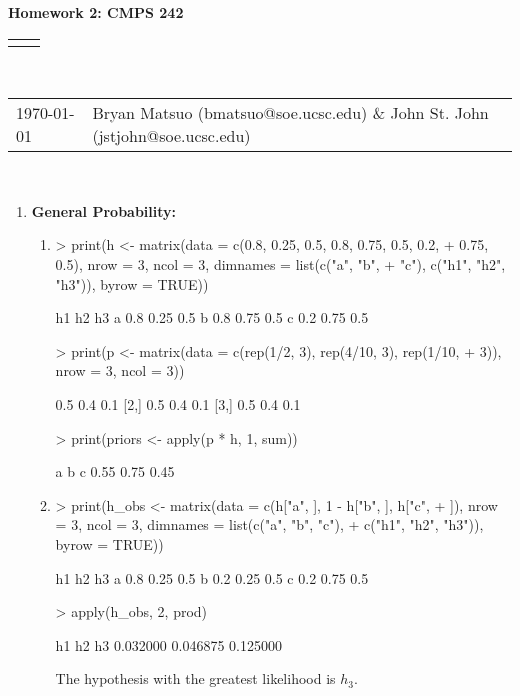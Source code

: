 \documentclass[12pt]{article}
\renewcommand{\title}[1]{\textbf{#1}\\}
\renewcommand{\line}{\begin{tabularx}{\textwidth}{X>{\raggedleft}X}\hline\\\end{tabularx}\\[-0.5cm]}
\newcommand{\leftright}[2]{\begin{tabularx}{\textwidth}{X>{\raggedleft}X}#1%
& #2\\\end{tabularx}\\[-0.5cm]}
\begin{document}
\title{Homework 2: CMPS 242}
\line
\leftright{\today}{Bryan Matsuo (bmatsuo@soe.ucsc.edu) \& John St. John (jstjohn@soe.ucsc.edu)} %
\begin{enumerate}
\item \textbf{General Probability: }

\begin{enumerate}
\item %
\begin{Schunk}
\begin{Sinput}
> print(h <- matrix(data = c(0.8, 0.25, 0.5, 0.8, 0.75, 0.5, 0.2, 
+     0.75, 0.5), nrow = 3, ncol = 3, dimnames = list(c("a", "b", 
+     "c"), c("h1", "h2", "h3")), byrow = TRUE))
\end{Sinput}
\begin{Soutput}
   h1   h2  h3
a 0.8 0.25 0.5
b 0.8 0.75 0.5
c 0.2 0.75 0.5
\end{Soutput}
\begin{Sinput}
> print(p <- matrix(data = c(rep(1/2, 3), rep(4/10, 3), rep(1/10, 
+     3)), nrow = 3, ncol = 3))
\end{Sinput}
\begin{Soutput}
     [,1] [,2] [,3]
[1,]  0.5  0.4  0.1
[2,]  0.5  0.4  0.1
[3,]  0.5  0.4  0.1
\end{Soutput}
\begin{Sinput}
> print(priors <- apply(p * h, 1, sum))
\end{Sinput}
\begin{Soutput}
   a    b    c 
0.55 0.75 0.45 
\end{Soutput}
\end{Schunk}
\item %
\begin{Schunk}
\begin{Sinput}
> print(h_obs <- matrix(data = c(h["a", ], 1 - h["b", ], h["c", 
+     ]), nrow = 3, ncol = 3, dimnames = list(c("a", "b", "c"), 
+     c("h1", "h2", "h3")), byrow = TRUE))
\end{Sinput}
\begin{Soutput}
   h1   h2  h3
a 0.8 0.25 0.5
b 0.2 0.25 0.5
c 0.2 0.75 0.5
\end{Soutput}
\begin{Sinput}
> apply(h_obs, 2, prod)
\end{Sinput}
\begin{Soutput}
      h1       h2       h3 
0.032000 0.046875 0.125000 
\end{Soutput}
\end{Schunk}
The hypothesis with the greatest likelihood is $h_3$.


\end{enumerate}
\end{enumerate}
\end{document}
